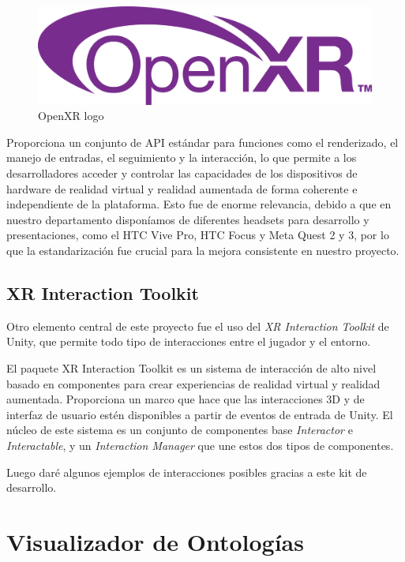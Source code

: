 \begin{figure}[ht]
   \begin{center}
      \includegraphics[width=0.4\linewidth]{chapter2/figures/OpenXR_logo.png}
   \end{center}
   \caption[OpenXR logo]
   {\footnotesize OpenXR logo}
\end{figure}

Proporciona un conjunto de API estándar para funciones como el renderizado, el manejo de entradas, el seguimiento y la interacción, lo que permite a los desarrolladores acceder y controlar las capacidades de los dispositivos de hardware de realidad virtual y realidad aumentada de forma coherente e independiente de la plataforma.
Esto fue de enorme relevancia, debido a que en nuestro departamento disponíamos de diferentes headsets para desarrollo y presentaciones, como el HTC Vive Pro, HTC Focus y Meta Quest 2 y 3, por lo que la estandarización fue crucial para la mejora consistente en nuestro proyecto.

\subsection{XR Interaction Toolkit}

Otro elemento central de este proyecto fue el uso del \textit{XR Interaction Toolkit} de Unity, que permite todo tipo de interacciones entre el jugador y el entorno.

El paquete XR Interaction Toolkit es un sistema de interacción de alto nivel basado en componentes para crear experiencias de realidad virtual y realidad aumentada. Proporciona un marco que hace que las interacciones 3D y de interfaz de usuario estén disponibles a partir de eventos de entrada de Unity. El núcleo de este sistema es un conjunto de componentes base \textit{Interactor} e \textit{Interactable}, y un \textit{Interaction Manager} que une estos dos tipos de componentes. \cite[]{XRInteraction}

Luego daré algunos ejemplos de interacciones posibles gracias a este kit de desarrollo.

\section{Visualizador de Ontologías}

